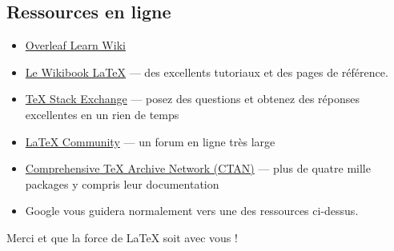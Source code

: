 \documentclass{beamer}
\begin{document}
\subsection{Ressources en ligne}
\begin{frame}{\insertsubsection}
\begin{itemize}
\item \href{https://www.overleaf.com/learn}{Overleaf Learn Wiki}
\item \href{http://en.wikibooks.org/wiki/LaTeX}{Le Wikibook \LaTeX{}} ---
des excellents tutoriaux et des pages de référence.
\item \href{http://tex.stackexchange.com/}{\TeX{} Stack Exchange} --- posez des questions et obtenez des réponses excellentes en un rien de temps
\item \href{http://www.latex-community.org/}{\LaTeX{} Community} --- un forum en ligne très large
\item \href{http://ctan.org/}{Comprehensive \TeX{} Archive Network (CTAN)} ---
plus de quatre mille packages y compris leur documentation
\item Google vous guidera normalement vers une des ressources ci-dessus.
\end{itemize}
\end{frame}

\begin{frame}
\begin{center}
Merci et que la force de \LaTeX{} soit avec vous !
\end{center}
\end{frame}
\end{document}
